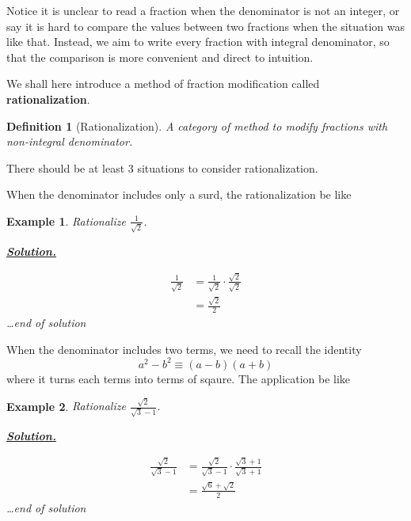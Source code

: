 \documentclass[12pt]{article}
\newtheorem{definition}{Definition}[section]
\newtheorem*{example}{Example}
\newenvironment{solution}{\begin{snugshade*} \underline{\textbf{Solution.}} \par}{\hfill \textit{\dots end of solution} \end{snugshade*}}
\begin{document}
    Notice it is unclear to read a fraction when the denominator is not an integer, or say it is hard to compare the values between two fractions when the situation was like that. Instead, we aim to write every fraction with integral denominator, so that the comparison is more convenient and direct to intuition.

    We shall here introduce a method of fraction modification called \textbf{rationalization}.

    \begin{definition}[Rationalization]
        A category of method to modify fractions with non-integral denominator.
    \end{definition}

    There should be at least 3 situations to consider rationalization.

    When the denominator includes only a surd, the rationalization be like

    \begin{example}
        Rationalize $\frac{1}{\sqrt{2}}$.

        \begin{solution}
            \begin{align*}
                \frac{1}{\sqrt{2}}&=\frac{1}{\sqrt{2}}\cdot \frac{\sqrt{2}}{\sqrt{2}}\\
                &=\frac{\sqrt{2}}{2}
            \end{align*}
        \end{solution}
    \end{example}

    When the denominator includes two terms, we need to recall the identity \[a^2-b^2\equiv (a-b)(a+b)\] where it turns each terms into terms of sqaure. The application be like

    \begin{example}
        Rationalize $\frac{\sqrt{2}}{\sqrt{3}-1}$.

        \begin{solution}
            \begin{align*}
                \frac{\sqrt{2}}{\sqrt{3}-1}&=\frac{\sqrt{2}}{\sqrt{3}-1}\cdot \frac{\sqrt{3}+1}{\sqrt{3}+1}\\
                &=\frac{\sqrt{6}+\sqrt{2}}{2}
            \end{align*}
        \end{solution}
    \end{example}
\end{document}
